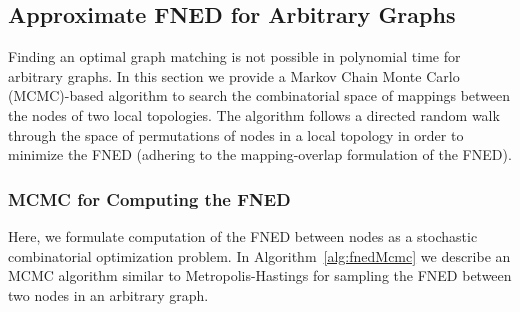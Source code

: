 \documentclass{article}
\begin{document}


\subsection{Approximate FNED for Arbitrary Graphs}
\label{sec:approxFned}

Finding an optimal graph matching is not possible in polynomial time for arbitrary graphs. In this section we provide a Markov Chain Monte Carlo (MCMC)-based algorithm to search the combinatorial space of mappings between the nodes of two local topologies. The algorithm follows a directed random walk through the space of permutations of nodes in a local topology in order to minimize the FNED (adhering to the mapping-overlap formulation of the FNED).


\subsubsection{MCMC for Computing the FNED}
Here, we formulate computation of the FNED between nodes as a stochastic combinatorial optimization problem. In Algorithm~\ref{alg:fnedMcmc} we describe an MCMC algorithm similar to Metropolis-Hastings for sampling the FNED between two nodes in an arbitrary graph.
\end{document}
